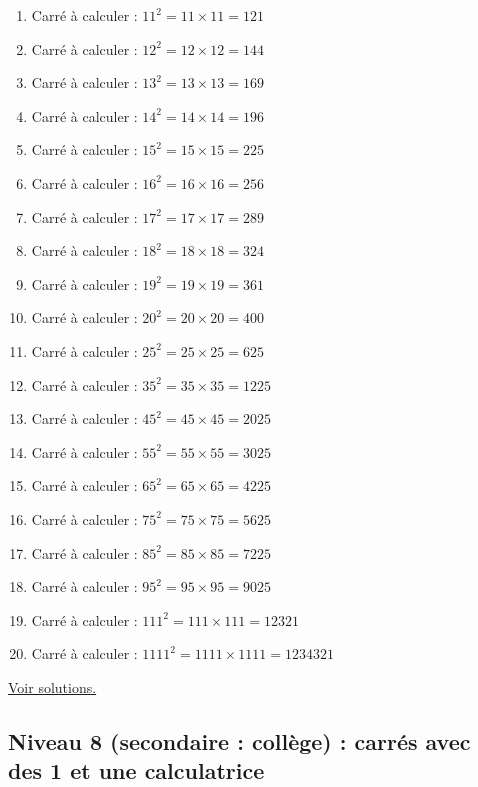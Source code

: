 \documentclass[11pt]{article}
\begin{document}
\label{org7dc1f19}


\begin{enumerate}
\item Carré à calculer : \(11^2 = 11 \times 11 = 121\)
\item Carré à calculer : \(12^2 = 12 \times 12 = 144\)
\item Carré à calculer : \(13^2 = 13 \times 13 = 169\)
\item Carré à calculer : \(14^2 = 14 \times 14 = 196\)
\item Carré à calculer : \(15^2 = 15 \times 15 = 225\)
\item Carré à calculer : \(16^2 = 16 \times 16 = 256\)
\item Carré à calculer : \(17^2 = 17 \times 17 = 289\)
\item Carré à calculer : \(18^2 = 18 \times 18 = 324\)
\item Carré à calculer : \(19^2 = 19 \times 19 = 361\)
\item Carré à calculer : \(20^2 = 20 \times 20 = 400\)
\item Carré à calculer : \(25^2 = 25 \times 25 =  625\)
\item Carré à calculer : \(35^2 = 35 \times 35 = 1225\)
\item Carré à calculer : \(45^2 = 45 \times 45 = 2025\)
\item Carré à calculer : \(55^2 = 55 \times 55 = 3025\)
\item Carré à calculer : \(65^2 = 65 \times 65 = 4225\)
\item Carré à calculer : \(75^2 = 75 \times 75 = 5625\)
\item Carré à calculer : \(85^2 = 85 \times 85 = 7225\)
\item Carré à calculer : \(95^2 = 95 \times 95 = 9025\)
\item Carré à calculer : \(111^2 = 111 \times 111 = 12321\)
\item Carré à calculer : \(1111^2 = 1111 \times 1111 = 1234321\)
\end{enumerate}



\hyperref[org5c96425]{Voir solutions.}



\newpage

\subsection{Niveau 8 (secondaire : collège) : carrés avec des 1 et une calculatrice}
\label{sec:org7147b10}
\end{document}
